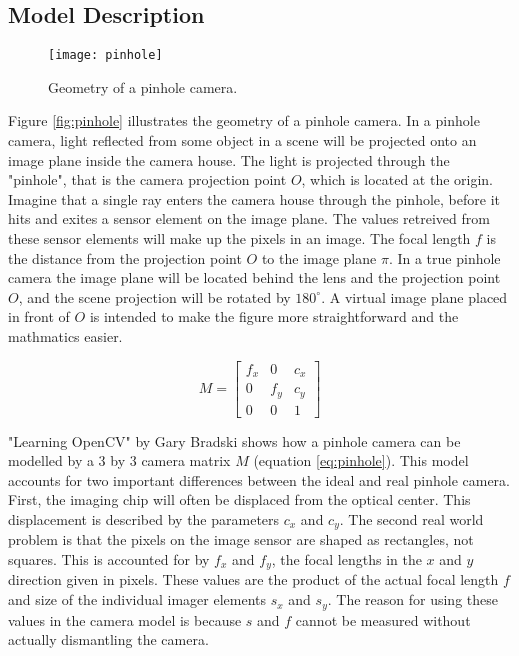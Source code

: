 \subsection{Model Description}

\begin{wrapfigure}{r}{0.65\textwidth}
	\vspace{-10pt} %
	\centering
	\texttt{[image: pinhole]}
	\caption{\label{fig:pinhole}Geometry of a pinhole camera.}
	\vspace{-10pt} %
	\label{phantompic}
\end{wrapfigure}

Figure \ref{fig:pinhole} illustrates the geometry of a pinhole camera. In a pinhole camera, light reflected from some object in a scene will be projected onto an image plane inside the camera house. The light is projected through the "pinhole", that is the camera projection point $O$, which is located at the origin. Imagine that a single ray enters the camera house through the pinhole, before it hits and exites a sensor element on the image plane. The values retreived from these sensor elements will make up the pixels in an image. The focal length $f$ is the distance from the projection point $O$ to the image plane $\pi$. In a true pinhole camera the image plane will be located behind the lens and the projection point $O$, and the scene projection will be rotated by $180^{\circ}$. A virtual image plane placed in front of $O$ is intended to make the figure more straightforward and the mathmatics easier. 

\begin{equation}
M = \begin{bmatrix}
f_x & 0 & c_x \\
0 & f_y & c_y \\
0 & 0 & 1
\end{bmatrix}
\label{eq:pinhole}
\end{equation}

"Learning OpenCV" by Gary Bradski\cite{oreillycv} shows how a pinhole camera can be modelled by a 3 by 3 camera matrix $M$ (equation \ref{eq:pinhole}). This model accounts for two important differences between the ideal and real pinhole camera. First, the imaging chip will often be displaced from the optical center. This displacement is described by the parameters $c_x$ and $c_y$. The second real world problem is that the pixels on the image sensor are shaped as rectangles, not squares. This is accounted for by $f_x$ and $f_y$, the focal lengths in the $x$ and $y$ direction given in pixels. These values are the product of the actual focal length $f$ and size of the individual imager elements $s_x$ and $s_y$. The reason for using these values in the camera model is because $s$ and $f$ cannot be measured without actually dismantling the camera\cite{oreillycv}.

